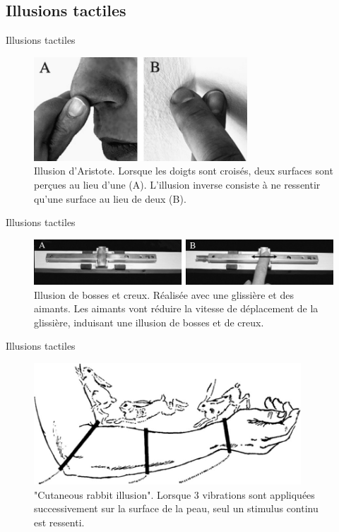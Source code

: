 \documentclass[compress, noflama]{beamer}
\begin{document}
\subsection{Illusions tactiles}
{
\begin{frame}{Illusions tactiles}
\begin{figure}
\centering
\includegraphics[width=8cm]{images/illusions_aristote}
\caption{Illusion d'Aristote. Lorsque les doigts sont croisés, deux surfaces sont perçues au lieu d'une (A). L'illusion inverse consiste à ne ressentir qu'une surface au lieu de deux (B).}
\end{figure}
\end{frame}

\begin{frame}{Illusions tactiles}
\begin{figure}
\centering
\includegraphics[width=\linewidth]{images/illusions_bump}
\caption{Illusion de bosses et creux. Réalisée avec une glissière et des aimants. Les aimants vont réduire la vitesse de déplacement de la glissière, induisant une illusion de bosses et de creux.}
\end{figure}
\end{frame}
}

{
\begin{frame}{Illusions tactiles}
\begin{figure}
\centering
\includegraphics[width=10cm]{images/illusions_rabbit}
\caption{"Cutaneous rabbit illusion". Lorsque 3 vibrations sont appliquées successivement sur la surface de la peau, seul un stimulus continu est ressenti.}
\end{figure}
\end{frame}
}
\end{document}
